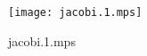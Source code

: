 \documentclass[letterpaper,10pt]{article}
\begin{document}
\begin{figure}
    \centering
    \texttt{[image: jacobi.1.mps]}
    \caption{jacobi.1.mps}
\end{figure}
\end{document}
